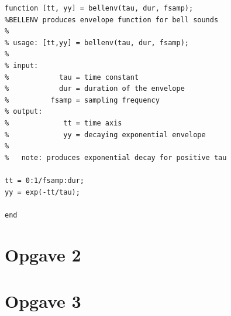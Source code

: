 \documentclass{article}
\begin{document}
\begin{lstlisting}
function [tt, yy] = bellenv(tau, dur, fsamp);
%BELLENV produces envelope function for bell sounds
%
% usage: [tt,yy] = bellenv(tau, dur, fsamp);
%
% input:
%            tau = time constant
%            dur = duration of the envelope
%          fsamp = sampling frequency
% output:
%             tt = time axis
%             yy = decaying exponential envelope
%
%   note: produces exponential decay for positive tau

tt = 0:1/fsamp:dur;
yy = exp(-tt/tau);

end
\end{lstlisting}

\section{Opgave 2}


\section{Opgave 3}
\end{document}
